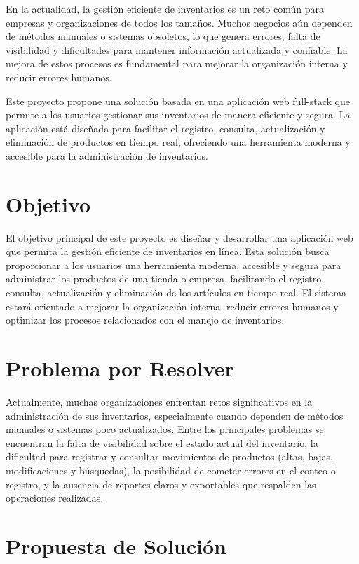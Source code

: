 En la actualidad, la gestión eficiente de inventarios es un reto común para empresas y organizaciones de todos los tamaños. Muchos negocios aún dependen de métodos manuales o sistemas obsoletos, lo que genera errores, falta de visibilidad y dificultades para mantener información actualizada y confiable. La mejora de estos procesos es fundamental para mejorar la organización interna y reducir errores humanos.

Este proyecto propone una solución basada en una aplicación web full-stack que permite a los usuarios gestionar sus inventarios de manera eficiente y segura. La aplicación está diseñada para facilitar el registro, consulta, actualización y eliminación de productos en tiempo real, ofreciendo una herramienta moderna y accesible para la administración de inventarios.

\section{Objetivo}

El objetivo principal de este proyecto es diseñar y desarrollar una aplicación web que permita la gestión eficiente de inventarios en línea. Esta solución busca proporcionar a los usuarios una herramienta moderna, accesible y segura para administrar los productos de una tienda o empresa, facilitando el registro, consulta, actualización y eliminación de los artículos en tiempo real. El sistema estará orientado a mejorar la organización interna, reducir errores humanos y optimizar los procesos relacionados con el manejo de inventarios.

\section{Problema por Resolver}

Actualmente, muchas organizaciones enfrentan retos significativos en la administración de sus inventarios, especialmente cuando dependen de métodos manuales o sistemas poco actualizados. Entre los principales problemas se encuentran la falta de visibilidad sobre el estado actual del inventario, la dificultad para registrar y consultar movimientos de productos (altas, bajas, modificaciones y búsquedas), la posibilidad de cometer errores en el conteo o registro, y la ausencia de reportes claros y exportables que respalden las operaciones realizadas.

\section{Propuesta de Solución}

